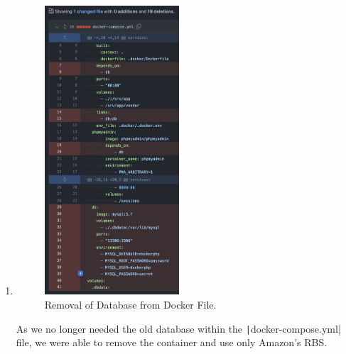 \begin{enumerate}
    \item 
    \begin{figure}[H]
        \centering
        \includegraphics[width=50mm]{resources/rds/docker}
        \caption{Removal of Database from Docker File.}
        \label{fig:rds-rm-docker-compose}
    \end{figure}\nolinebreak
    As we no longer needed the old database within the \texttt|docker-compose.yml| file, we were able to remove the container and use only Amazon's RBS.
\end{enumerate}